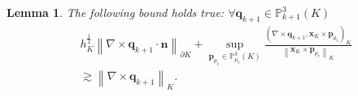 \documentclass[10pt,a4paper]{amsart}
\newtheorem{lemma}{Lemma}
\begin{document}
\begin{lemma}
  \label{lem:sfsubbound}The following bound holds true: \(\forall \boldsymbol{q}_{k+1}\in\mathbb{P}_{k+1}^{3}(K)\)
  \begin{equation}\label{eq:contrasf}
    \begin{aligned}
       & h^{\frac{1}{2}}_{K}\left\|\nabla \times \boldsymbol{q}_{k+1}\cdot \boldsymbol{n}\right\|_{\partial K}+\sup_{\boldsymbol{p}_{\mu_{\mathrm{r}}}\in \mathbb{P}_{\mu_{\mathrm{r}}}^{3}\left(K\right)}\frac{\left(\nabla \times \boldsymbol{q}_{k+1},\boldsymbol{x}_K \times \boldsymbol{p}_{\mu_{\mathrm{r}}}\right)_{K}}{\left\|\boldsymbol{x}_K \times \boldsymbol{p}_{\mu_{\mathrm{r}}}\right\|_{K}} \\
       & \gtrsim\left\|\nabla \times\boldsymbol{q}_{k+1}\right\|_{K}.
    \end{aligned}
  \end{equation}
\end{lemma}
\end{document}

